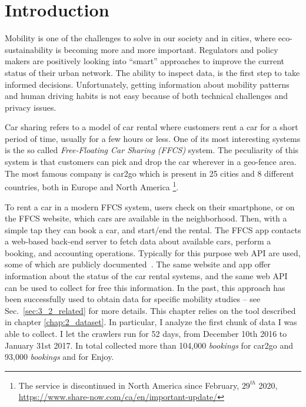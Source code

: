 \section{Introduction}
\label{sec:3_1_intro}

Mobility is one of the challenges to solve in our society and in cities, where eco-sustainability is becoming more and more important. 
Regulators and policy makers are positively looking into ``smart'' approaches to improve the current status of their urban network.  The ability to inspect data, is the first step to take informed decisions. Unfortunately, getting information about mobility patterns and human driving habits is not easy because of both technical challenges and privacy issues.

Car sharing refers to a model of car rental where customers rent a car for a short period of time, usually for a few hours or less. One of its most interesting systems is the so called \textit{Free-Floating Car Sharing (FFCS)} system. The peculiarity of this system is that customers can pick and drop the car wherever in a geo-fence area.
The most famous company is car2go which is present in 25 cities and 8 different countries, both in Europe and North America \footnote{The service is discontinued in North America since February, $29^{th}$ 2020, \url{https://www.share-now.com/ca/en/important-update/}}.

To rent a car in a modern FFCS system, users check on their smartphone, or on the FFCS website, which cars are available in the neighborhood. Then, with a simple tap they can book a car, and start/end the rental. The FFCS app contacts a web-based back-end server to fetch data about available cars, perform a booking, and accounting operations. Typically for this purpose web API are used, some of which are publicly documented~\cite{car2goAPI}. The same website and app offer information about the status of the car rental systems, and the same web API can be used to collect for free this information. In the past, this approach has been successfully used to obtain data for specific mobility studies -- see Sec.~\ref{sec:3_2_related} for more details. 
This chapter relies on the tool described in chapter \ref{chap:2_dataset}. In particular, I analyze the first chunk of data I was able to collect. I let the crawlers run for 52 days,  from December 10th 2016 to January 31st 2017. In total \tool collected more than 104,000 \textit{bookings} for car2go and 93,000 \textit{bookings} and for Enjoy. 


